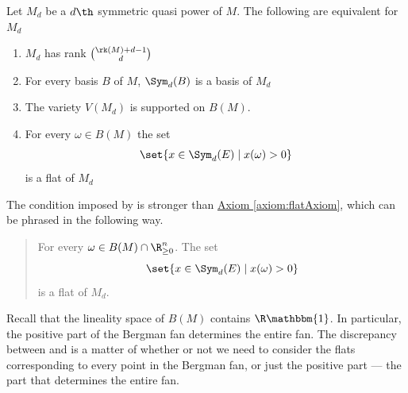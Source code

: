 \begin{proposition}\label{prop:symprodCharacterisations}
Let $M_d$ be a $d\th$ symmetric quasi power of $M$. The following are equivalent for $M_d$
\begin{enumerate}[label=(\roman*),]
    \item\label{prop:symprodCharacterisations.rk} $M_d$ has rank $\binom{\rk(M)+d-1}{d}$
    \item\label{prop:symprodCharacterisations.bases} For every basis $B$ of $M$, $\Sym_d(B)$ is a basis of $M_d$
    \item\label{prop:symprodCharacterisations.bf} The variety $V(M_d)$ is supported on $B(M)$.
    \item\label{prop:symprodCharacterisations.flats} For every $\omega\in B(M)$ the set
    $$\set{x\in \Sym_d(E)\mid x(\omega)>0}$$
    is a flat of $M_d$
\end{enumerate}
\end{proposition}
The condition imposed by  is stronger than \hyperref[axiom:flatAxiom]{Axiom \ref*{axiom:flatAxiom}}, which can be phrased in the following way.
\begin{quote}
    For every $\omega\in B(M)\cap \R^n_{\geq 0}$. The set
    $$\set{x\in \Sym_d(E)\mid x(\omega)>0}$$
    is a flat of $M_d$.
\end{quote}
Recall that the lineality space of $B(M)$ contains $\R \mathbbm{1}$. In particular, the positive part of the Bergman fan determines the entire fan. The discrepancy between  and  is a matter of whether or not we need to consider the flats corresponding to every point in the Bergman fan, or just the positive part --- the part that determines the entire fan.

